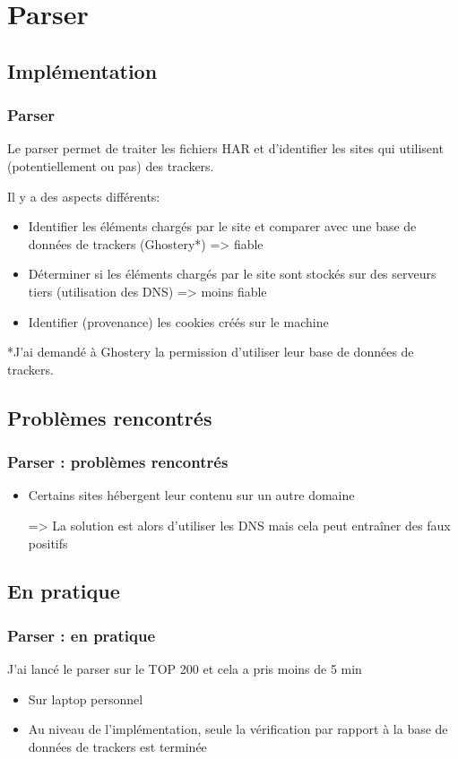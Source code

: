 \documentclass[compress]{beamer}
\begin{document}
  \section{Parser}
  \subsection{Implémentation}
  \begin{frame}
  \frametitle{Parser}
  Le parser permet de traiter les fichiers HAR et d'identifier les sites qui utilisent (potentiellement ou pas) des trackers.
  
  Il y a des aspects différents:
  \begin{itemize}
    \item Identifier les éléments chargés par le site et comparer avec une base de données de trackers (Ghostery*) => fiable
    \item Déterminer si les éléments chargés par le site sont stockés sur des serveurs tiers (utilisation des DNS) => moins fiable
    \item Identifier (provenance) les cookies créés sur le machine
    
  \end{itemize}
  
  *J'ai demandé à Ghostery la permission d'utiliser leur base de données de trackers.
  \end{frame}
  
  
  \subsection{Problèmes rencontrés}
  \begin{frame}
  \frametitle{Parser : problèmes rencontrés}
    \begin{itemize}
      \item Certains sites hébergent leur contenu sur un autre domaine
      
      => La solution est alors d'utiliser les DNS mais cela peut entraîner des faux positifs
    \end{itemize}
  \end{frame}
  
  \subsection{En pratique}
  \begin{frame}
  \frametitle{Parser : en pratique}
  J'ai lancé le parser sur le TOP 200 et cela a pris moins de 5 min
    \begin{itemize}
    \item Sur laptop personnel
    \item Au niveau de l'implémentation, seule la vérification par rapport à la base de données de trackers est terminée
    \end{itemize}
  \end{frame}
  
\end{document}
